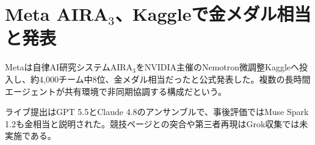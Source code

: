 \section{Meta AIRA$_3$、Kaggleで金メダル相当と発表}
Metaは自律AI研究システムAIRA$_3$をNVIDIA主催のNemotron微調整Kaggleへ投入し、約4,000チーム中8位、金メダル相当だったと公式発表した。複数の長時間エージェントが共有環境で非同期協調する構成だという。

ライブ提出はGPT 5.5とClaude 4.8のアンサンブルで、事後評価ではMuse Spark 1.2も金相当と説明された。競技ページとの突合や第三者再現はGrok収集では未実施である。
